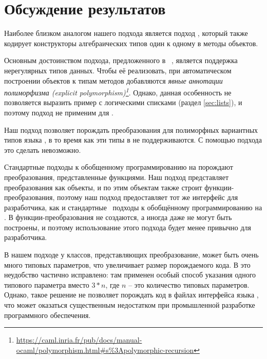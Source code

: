 \section{Обсуждение результатов}
\label{sec:discussion}

Наиболее близком аналогом нашего подхода является подход
 \visitors{}, который также кодирует конструкторы алгебраических типов один к одному в методы объектов. %

Основным достоинством подхода, предложенного в \visitors{}~\cite{Visitors}, является поддержка нерегулярных типов данных. Чтобы её реализовать, при автоматическом построении объектов к типам методов добавляются \emph{явные аннотации полиморфизма (explicit polymorphism)\footnote{\url{https://caml.inria.fr/pub/docs/manual-ocaml/polymorphism.html\#s\%3Apolymorphic-recursion}}}. Однако, данная особенность не позволяется выразить пример с логическими списками (раздел \ref{sec:lists}), и поэтому подход \visitors{} не применим для \OCanren{}.

Наш подход позволяет порождать преобразования для полиморфных вариантных типов языка \ocaml{}, в то время как эти типы в \visitors{} не поддерживаются. С помощью  подхода  \visitors{} это сделать невозможно.

Стандартные подходы к обобщенному программированию на \ocaml{} порождают преобразования, представленные функциями. Наш подход представляет преобразования как объекты, и по этим объектам также строит функции-преобразования, поэтому наш подход предоставляет тот же интерфейс для разработчика, как и стандартные~\cite{PPXLib,ppxderiving} подходы к обобщённому программированию на \ocaml{}. В \visitors{} функции-преобразования не создаются, а иногда даже не могут быть построены, и поэтому использование этого подхода будет менее привычно для разработчика.

В нашем подходе у классов, представляющих преобразование, может быть очень много типовых параметров, что увеличивает размер порождаемого кода. В \visitors{} это неудобство частично исправлено: там применен особый способ указания одного типового параметра вместо $3*n$, где $n$ -- это количество типовых параметров. Однако, такое решение не позволяет порождать код в файлах интерфейса языка \ocaml{}, что может оказаться существенным недостатком при промышленной разработке программного обеспечения.

